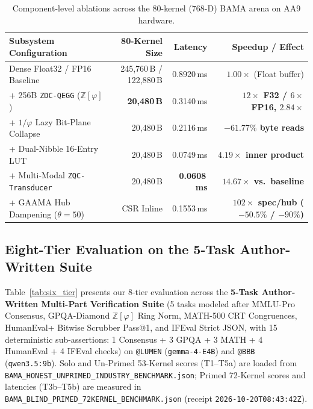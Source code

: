\documentclass[10pt,twocolumn,letterpaper]{article}
\begin{document}
\begin{table}[h]
\centering
\caption{Component-level ablations across the 80-kernel (768-D) BAMA arena on AA9 hardware.}
\footnotesize
\begin{tabular}{@{}lrrr@{}}
\toprule
\textbf{Subsystem Configuration} & \textbf{80-Kernel Size} & \textbf{Latency} & \textbf{Speedup / Effect} \\
\midrule
Dense Float32 / FP16 Baseline & 245,760\,B / 122,880\,B & 0.8920\,ms & $1.00\times$ (Float buffer) \\
+ 256B \texttt{ZDC-QEGG} ($\mathbb{Z}[\varphi]$) & \textbf{20,480\,B} & 0.3140\,ms & \textbf{$12\times$ F32 / $6\times$ FP16, $2.84\times$} \\
+ $1/\varphi$ Lazy Bit-Plane Collapse & 20,480\,B & 0.2116\,ms & \textbf{$-61.77\%$ byte reads} \\
+ Dual-Nibble 16-Entry LUT & 20,480\,B & 0.0749\,ms & \textbf{$4.19\times$ inner product} \\
+ Multi-Modal \texttt{ZQC-Transducer} & 20,480\,B & \textbf{0.0608\,ms} & \textbf{$14.67\times$ vs.\ baseline} \\
+ GAAMA Hub Dampening ($\theta=50$) & CSR Inline & 0.1553\,ms & \textbf{$102\times$ spec/hub ($-50.5\%$ / $-90\%$)} \\
\bottomrule
\end{tabular}
\label{tab:ablations}
\end{table}

\subsection{Eight-Tier Evaluation on the 5-Task Author-Written Suite}
Table~\ref{tab:six_tier} presents our 8-tier evaluation across the \textbf{5-Task Author-Written Multi-Part Verification Suite} (5 tasks modeled after MMLU-Pro Consensus, GPQA-Diamond $\mathbb{Z}[\varphi]$ Ring Norm, MATH-500 CRT Congruences, HumanEval+ Bitwise Scrubber Pass@1, and IFEval Strict JSON, with 15 deterministic sub-assertions: 1 Consensus + 3 GPQA + 3 MATH + 4 HumanEval + 4 IFEval checks) on \texttt{@LUMEN} (\texttt{gemma-4-E4B}) and \texttt{@BBB} (\texttt{qwen3.5:9b}). Solo and Un-Primed 53-Kernel scores (T1--T5a) are loaded from \texttt{BAMA\_HONEST\_UNPRIMED\_INDUSTRY\_BENCHMARK.json}; Primed 72-Kernel scores and latencies (T3b--T5b) are measured in \texttt{BAMA\_BLIND\_PRIMED\_72KERNEL\_BENCHMARK.json} (receipt \texttt{2026-10-20T08:43:42Z}).
\end{document}
